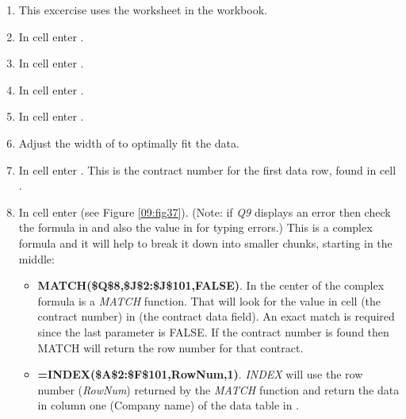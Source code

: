 \begin{enumerate}
	\item This excercise uses the  worksheet in the  workbook.
	\item In cell  enter .
	\item In cell  enter .
	\item In cell  enter .
	\item In cell  enter .
	\item Adjust the width of  to optimally fit the data.
	\item In cell  enter . This is the contract number for the first data row, found in cell .
	\item In cell  enter  (see Figure \ref{09:fig37}). (Note: if \textit{Q9} displays an error then check the formula in  and also the value in  for typing errors.) This is a complex formula and it will help to break it down into smaller chunks, starting in the middle: 
	
	\begin{itemize}
		\item \textbf{MATCH(\$Q\$8,\$J\$2:\$J\$101,FALSE)}. In the center of the complex formula is a \textit{MATCH} function. That will look for the value in cell  (the contract number) in  (the contract data field). An exact match is required since the last parameter is FALSE. If the contract number is found then MATCH will return the row number for that contract.
		\item \textbf{=INDEX(\$A\$2:\$F\$101,RowNum,1)}. \textit{INDEX} will use the row number (\textit{RowNum}) returned by the \textit{MATCH} function and return the data in column one (Company name) of the data table in .
	\end{itemize}
		

\end{enumerate}
